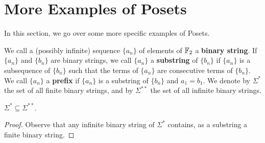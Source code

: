 \section{More Examples of Posets}

In this section, we go over some more specific examples of Posets.



\begin{definition}
  We call a (possibly infinite) sequence $\{a_n\}$ of elements of
  $\mathbb{F}_2$ a \textbf{binary string}. If $\{a_n\}$ and $\{b_n\}$ are
  binary strings, we call $\{a_n\}$ a \textbf{substring} of $\{b_n\}$
  if $\{a_n\}$ is a subsequence of $\{b_n\}$ such that the terms of
  $\{a_n\}$ are consecutive terms of $\{b_n\}$. We call $\{a_n\}$ a
  \textbf{prefix} if $\{a_n\}$ is a substring of $\{b_n\}$ and $a_1=b_1$.
  We denote by $\Sigma^\ast$ the set of all finite binary strings,
  and by $\Sigma^{\ast\ast}$ the set of all infinite binary strings.
\end{definition}

\begin{lemma}\label{lemma_1.2.1}
  $\Sigma^\ast \subseteq \Sigma^{\ast\ast}$.
\end{lemma}
\begin{proof}
  Observe that any infinite binary string of $\Sigma^\ast$ contains,
  as a substring a finite binary string.
\end{proof}

